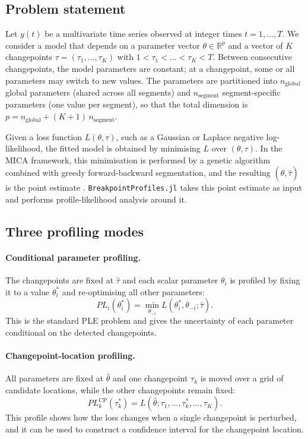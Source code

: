 \documentclass[10pt,letterpaper]{article}
\begin{document}
\subsection*{Problem statement}
Let $y(t)$ be a multivariate time series observed at integer times $t = 1, \dots, T$. We consider a model that depends on a parameter vector $\theta \in \mathbb{R}^p$ and a vector of $K$ changepoints $\tau = (\tau_1, \dots, \tau_K)$ with $1 < \tau_1 < \dots < \tau_K < T$. Between consecutive changepoints, the model parameters are constant; at a changepoint, some or all parameters may switch to new values. The parameters are partitioned into $n_\text{global}$ global parameters (shared across all segments) and $n_\text{segment}$ segment-specific parameters (one value per segment), so that the total dimension is $p = n_\text{global} + (K+1) \, n_\text{segment}$.

Given a loss function $L(\theta, \tau)$, such as a Gaussian or Laplace negative log-likelihood, the fitted model is obtained by minimising $L$ over $(\theta, \tau)$. In the MICA framework, this minimisation is performed by a genetic algorithm combined with greedy forward-backward segmentation, and the resulting $(\hat{\theta}, \hat{\tau})$ is the point estimate \cite{mica}. \texttt{BreakpointProfiles.jl} takes this point estimate as input and performs profile-likelihood analysis around it.

\subsection*{Three profiling modes}

\paragraph*{Conditional parameter profiling.}
The changepoints are fixed at $\hat{\tau}$ and each scalar parameter $\theta_i$ is profiled by fixing it to a value $\theta_i^*$ and re-optimising all other parameters:
\begin{equation}
\label{eq:conditional}
PL_i(\theta_i^*) = \min_{\theta_{-i}} L(\theta_i^*, \theta_{-i}; \hat{\tau}).
\end{equation}
This is the standard PLE problem and gives the uncertainty of each parameter conditional on the detected changepoints.

\paragraph*{Changepoint-location profiling.}
All parameters are fixed at $\hat{\theta}$ and one changepoint $\tau_k$ is moved over a grid of candidate locations, while the other changepoints remain fixed:
\begin{equation}
\label{eq:cp}
PL_k^{\text{CP}}(\tau_k^*) = L(\hat{\theta}; \tau_1, \dots, \tau_k^*, \dots, \tau_K).
\end{equation}
This profile shows how the loss changes when a single changepoint is perturbed, and it can be used to construct a confidence interval for the changepoint location.
\end{document}
